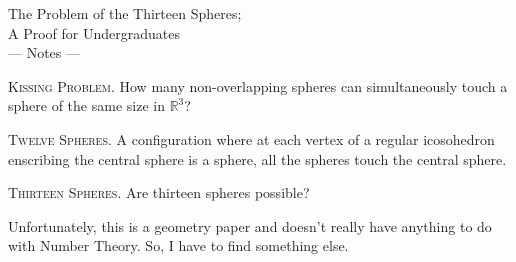 \documentclass{article}
\newcommand{\R}{\mathbb{R}}
\newcommand{\header}[1]{\noindent\textsc{#1.} }
\begin{document}
\begin{center}
  {\huge The Problem of the Thirteen Spheres;\\A Proof for Undergraduates}
  \\[1em]
  {\large --- Notes ---}
\end{center}

\vspace{2em}

\header{Kissing Problem}
How many non-overlapping spheres can simultaneously touch a sphere of the same size in $\R^3$?

\header{Twelve Spheres}
A configuration where at each vertex of a regular icosohedron enscribing the central sphere is a sphere, all the spheres touch the central sphere.

\header{Thirteen Spheres}
Are thirteen spheres possible?

Unfortunately, this is a geometry paper and doesn't really have anything to do with Number Theory.
So, I have to find something else.
\end{document}
